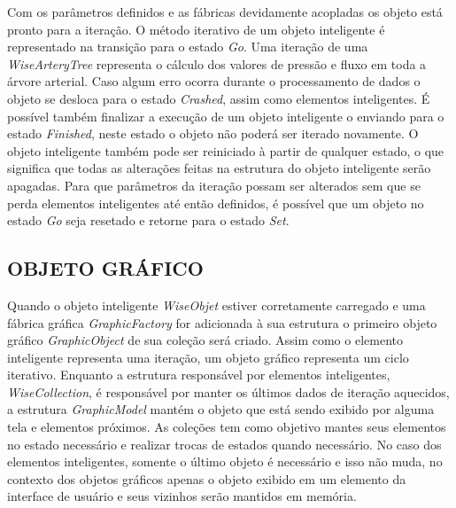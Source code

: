 \documentclass[a4paper,12pt]{monografia}
\theoremstyle{plain}
\theoremstyle{definition}
\theoremstyle{remark}
\begin{document}
Com os parâmetros definidos e as fábricas devidamente acopladas os objeto está pronto para a iteração. O método iterativo de um objeto inteligente é representado na transição para o estado \textit{Go}. Uma iteração de uma \textit{WiseArteryTree} representa o cálculo dos valores de pressão e fluxo em toda a árvore arterial. Caso algum erro ocorra durante o processamento de dados o objeto se desloca para o estado \textit{Crashed}, assim como elementos inteligentes. É possível também finalizar a execução de um objeto inteligente o enviando para o estado \textit{Finished}, neste estado o objeto não poderá ser iterado novamente. O objeto inteligente também pode ser reiniciado à partir de qualquer estado, o que significa que todas as alterações feitas na estrutura do objeto inteligente serão apagadas. Para que parâmetros da iteração possam ser alterados sem que se perda elementos inteligentes até então definidos, é possível que um objeto no estado \textit{Go} seja resetado e retorne para o estado \textit{Set}.

\subsection{OBJETO GRÁFICO}\label{sec:objeto_grafico}


Quando o objeto inteligente \textit{WiseObjet} estiver corretamente carregado e uma fábrica gráfica \textit{GraphicFactory} for adicionada à sua estrutura o primeiro objeto gráfico \textit{GraphicObject} de sua coleção será criado. Assim como o elemento inteligente representa uma iteração, um objeto gráfico representa um ciclo iterativo. Enquanto a estrutura responsável por elementos inteligentes, \textit{WiseCollection}, é responsável por manter os últimos dados de iteração aquecidos, a estrutura \textit{GraphicModel} mantém o objeto que está sendo exibido por alguma tela e elementos próximos. As coleções tem como objetivo mantes seus elementos no estado necessário e realizar trocas de estados quando necessário. No caso dos elementos inteligentes, somente o último objeto é necessário e isso não muda, no contexto dos objetos gráficos apenas o objeto exibido em um elemento da interface de usuário e seus vizinhos serão mantidos em memória.
\end{document}
